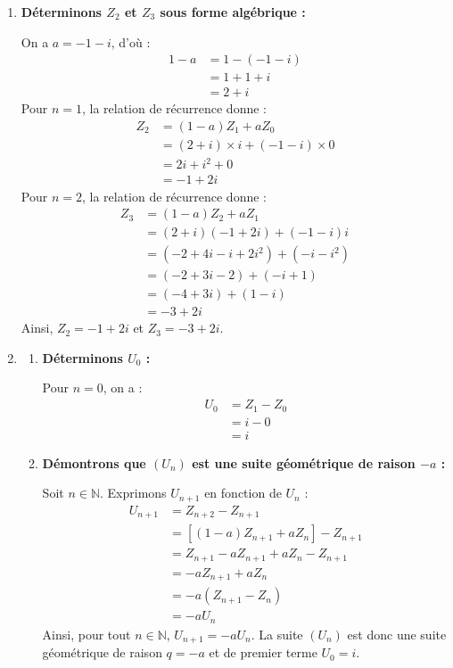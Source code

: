 \documentclass[12pt,a4paper]{article}
\begin{document}
\begin{enumerate}
    \item \textbf{Déterminons $Z_2$ et $Z_3$ sous forme algébrique :}
    
    On a $a = -1 - i$, d'où :
    $$
    \begin{aligned}
        1 - a &= 1 - (-1 - i) \\
        &= 1 + 1 + i \\
        &= 2 + i
    \end{aligned}
    $$
    Pour $n = 1$, la relation de récurrence donne :
    $$
    \begin{aligned}
        Z_2 &= (1 - a)Z_1 + aZ_0 \\
        &= (2 + i) \times i + (-1 - i) \times 0 \\
        &= 2i + i^2 + 0 \\
        &= -1 + 2i
    \end{aligned}
    $$
    Pour $n = 2$, la relation de récurrence donne :
    $$
    \begin{aligned}
        Z_3 &= (1 - a)Z_2 + aZ_1 \\
        &= (2 + i)(-1 + 2i) + (-1 - i)i \\
        &= (-2 + 4i - i + 2i^2) + (-i - i^2) \\
        &= (-2 + 3i - 2) + (-i + 1) \\
        &= (-4 + 3i) + (1 - i) \\
        &= -3 + 2i
    \end{aligned}
    $$
    Ainsi, $Z_2 = -1 + 2i$ et $Z_3 = -3 + 2i$.

    \item 
    \begin{enumerate}
        \item \textbf{Déterminons $U_0$ :}
        
        Pour $n = 0$, on a :
        $$
        \begin{aligned}
            U_0 &= Z_1 - Z_0 \\
            &= i - 0 \\
            &= i
        \end{aligned}
        $$

        \item \textbf{Démontrons que $(U_n)$ est une suite géométrique de raison $-a$ :}
        
        Soit $n \in \mathbb{N}$. Exprimons $U_{n+1}$ en fonction de $U_n$ :
        $$
        \begin{aligned}
            U_{n+1} &= Z_{n+2} - Z_{n+1} \\
            &= \left[ (1 - a)Z_{n+1} + aZ_n \right] - Z_{n+1} \\
            &= Z_{n+1} - aZ_{n+1} + aZ_n - Z_{n+1} \\
            &= -aZ_{n+1} + aZ_n \\
            &= -a(Z_{n+1} - Z_n) \\
            &= -aU_n
        \end{aligned}
        $$
        Ainsi, pour tout $n \in \mathbb{N}$, $U_{n+1} = -aU_n$. La suite $(U_n)$ est donc une suite géométrique de raison $q = -a$ et de premier terme $U_0 = i$.


\end{enumerate}
\end{enumerate}
\end{document}
